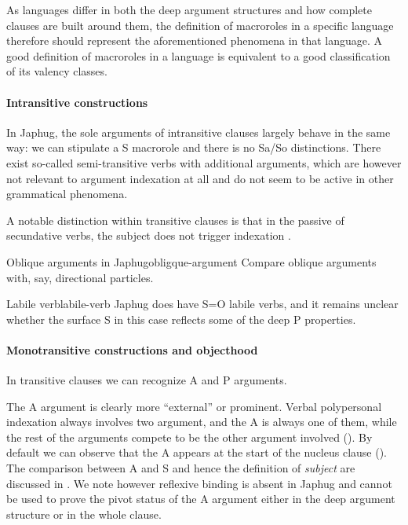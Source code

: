 \documentclass[a4paper, oneside, 12pt]{report}
\newcommand*{\citesec}[1]{\S~{#1}}
\newcommand*{\citepage}[1]{p.~{#1}}
\newcommand*{\term}[1]{\emph{#1}}
\begin{document}
As languages differ in both the deep argument structures
and how complete clauses are built around them,
the definition of macroroles in a specific language therefore should represent 
the aforementioned phenomena in that language.
A good definition of macroroles in a language
is equivalent to a good classification of its valency classes.

\paragraph*{Intransitive constructions}
In Japhug, the sole arguments of intransitive clauses largely behave in the same way:
we can stipulate a S macrorole and there is no Sa/So distinctions. 
There exist so-called semi-transitive verbs with additional arguments,
which are however not relevant to argument indexation at all
\citep[\citesec{14.2.5}]{jacques2021grammar}
and do not seem to be active in other grammatical phenomena.

A notable distinction within transitive clauses
is that in the passive of secundative verbs,
the subject does not trigger indexation
\citep[\citesec{18.1.4}]{jacques2021grammar}.

\begin{todobox}{Oblique arguments in Japhug}{obligque-argument}
    Compare oblique arguments with, say, directional particles.
\end{todobox}

\begin{todobox}{Labile verb}{labile-verb}
    Japhug does have S=O labile verbs,
    and it remains unclear whether the surface S in this case
    reflects some of the deep P properties. 
\end{todobox}

\paragraph*{Monotransitive constructions and objecthood}
In transitive clauses we can recognize A and P arguments.

The A argument is clearly more ``external'' or prominent.
Verbal polypersonal indexation always involves two argument,
and the A is always one of them, 
while the rest of the arguments compete to be the other argument involved 
().
By default we can observe that the A 
appears at the start of the nucleus clause 
().
The comparison between A and S and hence the definition of \term{subject}
are discussed in .
We note however reflexive binding is absent in Japhug
\citep[\citepage{543}]{jacques2021grammar}
and cannot be used to prove the pivot status of the A argument
either in the deep argument structure or in the whole clause.
\end{document}
